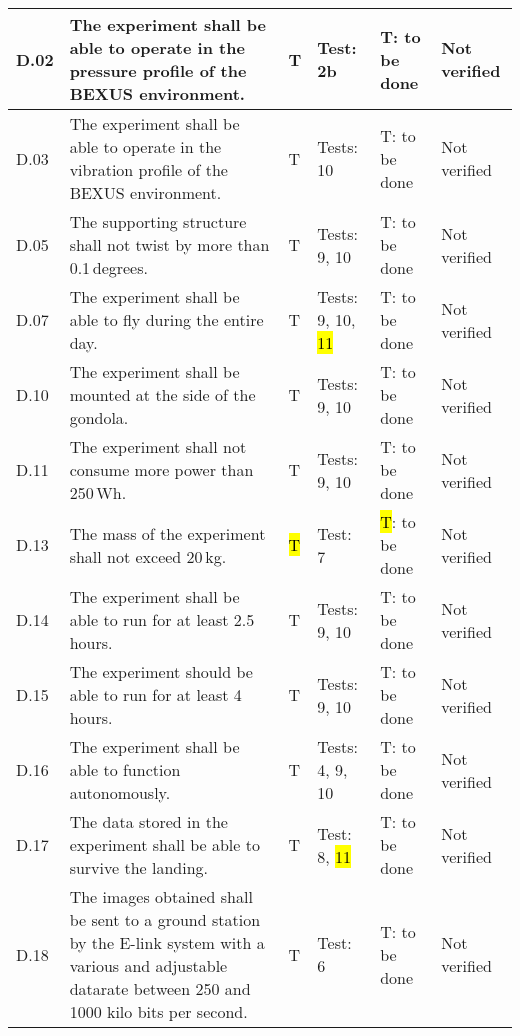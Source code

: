\begin{longtable}[]{|m{}| m{}|m{}|m{}|m{}|m{}|}
D.02 & The experiment shall be able to operate in the pressure profile of the BEXUS environment.
& T & Test: 2b  & T: to be done & Not verified \\\hline

D.03 & The experiment shall be able to operate in the vibration profile of the BEXUS environment.
& T & Tests: 10 & T: to be done & Not verified \\\hline

D.05 & The supporting structure shall not twist by more than 0.1\,degrees.
& T & Tests: 9, 10 & T: to be done & Not verified \\\hline

D.07 & The experiment shall be able to fly during the entire day.
& T & Tests: 9, 10, \hl{11} & T: to be done & Not verified \\\hline

D.10 & The experiment shall be mounted at the side of the gondola.
& T & Tests: 9, 10 & T: to be done & Not verified \\\hline

D.11 & The experiment shall not consume more power than 250\,Wh.
& T & Tests: 9, 10 & T: to be done & Not verified \\\hline

D.13 & The mass of the experiment shall not exceed 20\,kg.
& \hl{T} & Test: 7 & \hl{T}: to be done & Not verified \\\hline

D.14 & The experiment shall be able to run for at least 2.5\,hours.
& T & Tests: 9, 10 & T: to be done & Not verified \\\hline

D.15 & The experiment should be able to run for at least 4\,hours.
& T & Tests: 9, 10 & T: to be done & Not verified \\\hline

D.16 & The experiment shall be able to function autonomously.
& T & Tests: 4, 9, 10 & T: to be done & Not verified \\\hline

D.17 & The data stored in the experiment shall be able to survive the landing.
& T & Test: 8, \hl{11} & T: to be done & Not verified \\\hline

\rowcolor{yellow} D.18 & The images obtained shall be sent to a ground station by the E-link system with a various and adjustable datarate between 250 and 1000 kilo bits per second.
& T & Test: 6 & T: to be done & Not verified \\\hline





\end{longtable}
